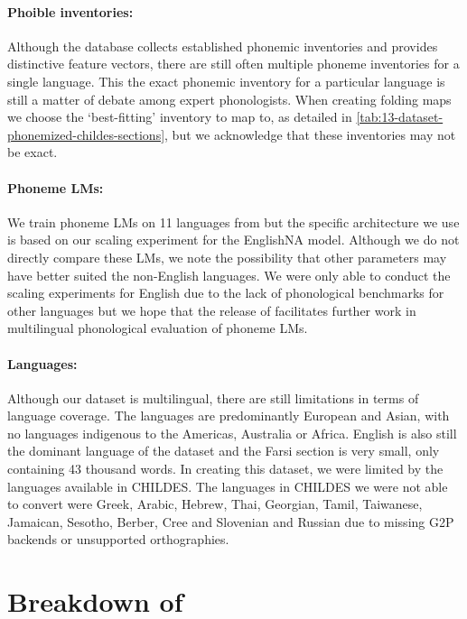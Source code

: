 \paragraph{Phoible inventories:} Although the \phoible database collects established phonemic inventories and provides distinctive feature vectors, there are still often multiple phoneme inventories for a single language. This the exact phonemic inventory for a particular language is still a matter of debate among expert phonologists. When creating folding maps we choose the `best-fitting' inventory to map to, as detailed in \cref{tab:13-dataset-phonemized-childes-sections}, but we acknowledge that these inventories may not be exact.

\paragraph{Phoneme LMs:} We train phoneme LMs on 11 languages from \ipachildes but the specific architecture we use is based on our scaling experiment for the EnglishNA model. Although we do not directly compare these LMs, we note the possibility that other parameters may have better suited the non-English languages. We were only able to conduct the scaling experiments for English due to the lack of phonological benchmarks for other languages but we hope that the release of \ipachildes facilitates further work in multilingual phonological evaluation of phoneme LMs.

\paragraph{Languages:} Although our dataset is multilingual, there are still limitations in terms of language coverage. The languages are predominantly European and Asian, with no languages indigenous to the Americas, Australia or Africa. English is also still the dominant language of the dataset and the Farsi section is very small, only containing 43 thousand words. In creating this dataset, we were limited by the languages available in CHILDES. The languages in CHILDES we were not able to convert were Greek, Arabic, Hebrew, Thai, Georgian, Tamil, Taiwanese, Jamaican, Sesotho, Berber, Cree and Slovenian and Russian due to missing G2P backends or unsupported orthographies.

\section{Breakdown of \ipachildes}\label{app:13-:13-breakdown}

